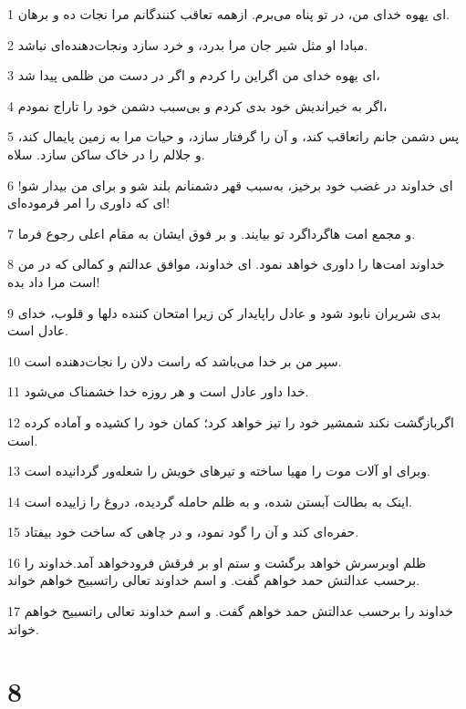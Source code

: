 \par 1 ای یهوه خدای من، در تو پناه می‌برم. ازهمه تعاقب کنندگانم مرا نجات ده و برهان.
\par 2 مبادا او مثل شیر جان مرا بدرد، و خرد سازد ونجات‌دهنده‌ای نباشد.
\par 3 ‌ای یهوه خدای من اگراین را کردم و اگر در دست من ظلمی پیدا شد،
\par 4 اگر به خیراندیش خود بدی کردم و بی‌سبب دشمن خود را تاراج نمودم،
\par 5 پس دشمن جانم راتعاقب کند، و آن را گرفتار سازد، و حیات مرا به زمین پایمال کند، و جلالم را در خاک ساکن سازد. سلاه.
\par 6 ‌ای خداوند در غضب خود برخیز، به‌سبب قهر دشمنانم بلند شو و برای من بیدار شو! ای که داوری را امر فرموده‌ای!
\par 7 و مجمع امت هاگرداگرد تو بیایند. و بر فوق ایشان به مقام اعلی رجوع فرما.
\par 8 خداوند امت‌ها را داوری خواهد نمود. ای خداوند، موافق عدالتم و کمالی که در من است مرا داد بده!
\par 9 بدی شریران نابود شود و عادل راپایدار کن زیرا امتحان کننده دلها و قلوب، خدای عادل است.
\par 10 سپر من بر خدا می‌باشد که راست دلان را نجات‌دهنده است.
\par 11 خدا داور عادل است و هر روزه خدا خشمناک می‌شود.
\par 12 اگربازگشت نکند شمشیر خود را تیز خواهد کرد؛ کمان خود را کشیده و آماده کرده است.
\par 13 وبرای او آلات موت را مهیا ساخته و تیرهای خویش را شعله‌ور گردانیده است.
\par 14 اینک به بطالت آبستن شده، و به ظلم حامله گردیده، دروغ را زاییده است.
\par 15 حفره‌ای کند و آن را گود نمود، و در چاهی که ساخت خود بیفتاد.
\par 16 ظلم اوبرسرش خواهد برگشت و ستم او بر فرقش فرودخواهد آمد.خداوند را برحسب عدالتش حمد خواهم گفت. و اسم خداوند تعالی راتسبیح خواهم خواند.
\par 17 خداوند را برحسب عدالتش حمد خواهم گفت. و اسم خداوند تعالی راتسبیح خواهم خواند.
 
\chapter{8}

